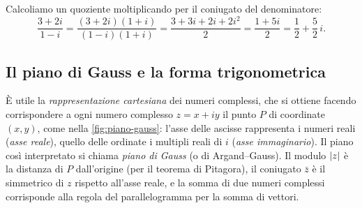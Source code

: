 \begin{esempio}
Calcoliamo un quoziente moltiplicando per il coniugato del denominatore:
\[
  \frac{3+2i}{1-i}=\frac{(3+2i)(1+i)}{(1-i)(1+i)}=\frac{3+3i+2i+2i^{2}}{2}=\frac{1+5i}{2}
  =\frac12+\frac52\,i .
\]
\end{esempio}

\subsection{Il piano di Gauss e la forma trigonometrica}

È utile la \emph{rappresentazione cartesiana} dei numeri complessi, che si ottiene
facendo corrispondere a ogni numero complesso $z=x+iy$ il punto $P$ di coordinate
$(x,y)$, come nella \cref{fig:piano-gauss}: l'asse delle ascisse rappresenta i numeri
reali (\emph{asse reale}), quello delle ordinate i multipli reali di $i$ (\emph{asse
immaginario}). Il piano così interpretato si chiama \emph{piano di Gauss} (o di
Argand--Gauss). Il modulo $\lvert z\rvert$ è la distanza di $P$ dall'origine (per il teorema di
Pitagora), il coniugato $\bar z$ è il simmetrico di $z$ rispetto all'asse reale, e la
somma di due numeri complessi corrisponde alla regola del parallelogramma per la somma
di vettori.

